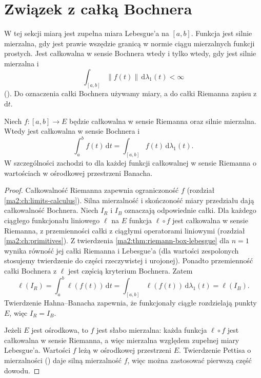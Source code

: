 \section{Związek z całką Bochnera}

W tej sekcji miarą jest zupełna miara Lebesgue'a
na $[a,b]$. Funkcja jest silnie mierzalna, gdy
jest prawie wszędzie granicą w normie ciągu
mierzalnych funkcji prostych.
Jest całkowalna w sensie Bochnera wtedy i tylko wtedy,
gdy jest silnie mierzalna i
\[
 \int_{[a,b]}\|f(t)\|\,\mathrm d\lambda_1(t)<\infty
\]
().
Do oznaczenia całki Bochnera używamy miary,
a do całki Riemanna zapisu z $\mathrm dt$.

\begin{twierdzenie}
\label{ma2:thm:vector-riemann-bochner}
Niech $f:[a,b]\to E$ będzie całkowalna
w sensie Riemanna oraz silnie mierzalna.
Wtedy jest całkowalna w sensie Bochnera i
\[
 \int_a^b f(t)\,\mathrm dt
 =\int_{[a,b]}f(t)\,\mathrm d\lambda_1(t).
\]
W szczególności zachodzi to dla każdej
funkcji całkowalnej w sensie Riemanna
o wartościach w ośrodkowej przestrzeni Banacha.
\end{twierdzenie}
\begin{proof}
Całkowalność Riemanna zapewnia ograniczoność
$f$ (rozdział \ref{ma2:ch:limits-calculus}).
Silna mierzalność i skończoność miary przedziału
dają całkowalność Bochnera.
Niech $I_R$ i $I_B$ oznaczają odpowiednie całki.
Dla każdego ciągłego funkcjonału liniowego
$\ell$ na $E$ funkcja $\ell\circ f$ jest
całkowalna w sensie Riemanna, z przemienności
całki z ciągłymi operatorami liniowymi
(rozdział \ref{ma2:ch:primitives}).
Z twierdzenia
\ref{ma2:thm:riemann-box-lebesgue}
dla $n=1$ wynika równość jej całki Riemanna
i Lebesgue'a (dla wartości zespolonych
stosujemy twierdzenie do części rzeczywistej
i urojonej).
Ponadto przemienność całki Bochnera z $\ell$
jest częścią kryterium Bochnera.
Zatem
\[
 \ell(I_R)=\int_a^b\ell(f(t))\,\mathrm dt
 =\int_{[a,b]}\ell(f(t))\,\mathrm d\lambda_1(t)
 =\ell(I_B).
\]
Twierdzenie Hahna--Banacha zapewnia, że
funkcjonały ciągłe rozdzielają punkty $E$,
więc $I_R=I_B$.

Jeżeli $E$ jest ośrodkowa, to $f$ jest
słabo mierzalna: każda funkcja $\ell\circ f$
jest całkowalna w sensie Riemanna, a więc
mierzalna względem zupełnej miary Lebesgue'a.
Wartości $f$ leżą w ośrodkowej przestrzeni $E$.
Twierdzenie Pettisa o mierzalności
()
daje silną mierzalność $f$, więc można
zastosować pierwszą część dowodu.
\end{proof}

